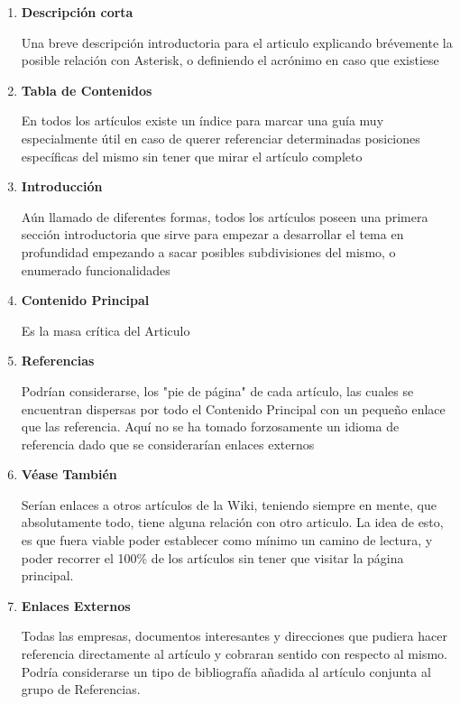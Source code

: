 \begin{enumerate}
	  \setlength{\itemsep}{10pt}

	\item \textbf{Descripción corta} 
	
	Una breve descripción introductoria para el articulo explicando brévemente la posible relación con Asterisk, o definiendo el acrónimo en caso que existiese
	
	\item \textbf{Tabla de Contenidos} 
	
	En todos los artículos existe un índice para marcar una guía muy especialmente útil en caso de querer referenciar determinadas posiciones específicas del mismo sin tener que mirar el artículo completo
  
	\item \textbf{Introducción} 
	
  Aún llamado de diferentes formas, todos los artículos poseen una primera sección introductoria que sirve para empezar a desarrollar el tema en profundidad empezando a sacar posibles subdivisiones del mismo, o enumerado funcionalidades
 
  \item \textbf{Contenido Principal} 
	
	Es la masa crítica del Articulo
  
	\item \textbf{Referencias} 
	
	Podrían considerarse, los "pie de página" de cada artículo, las cuales se encuentran dispersas por todo el Contenido Principal con un pequeño enlace que las referencia. Aquí no se ha tomado forzosamente un idioma de referencia dado que se considerarían enlaces externos

 	\item \textbf{Véase También} 
	
	Serían enlaces a otros artículos de la Wiki, teniendo siempre en mente, que absolutamente todo, tiene alguna relación con otro articulo. La idea de esto, es que fuera viable poder establecer como mínimo un camino de lectura, y poder recorrer el 100\% de los artículos sin tener que visitar la página principal.
	
	\item \textbf{Enlaces Externos} 
	
	Todas las empresas, documentos interesantes y direcciones que pudiera hacer referencia directamente al artículo y cobraran sentido con respecto al mismo. Podría considerarse un tipo de bibliografía añadida al artículo conjunta al grupo de Referencias.

\end{enumerate}

